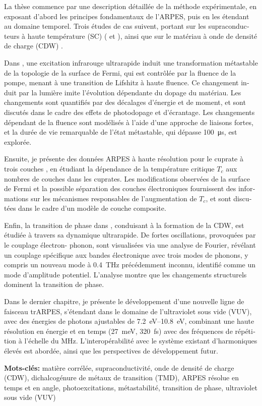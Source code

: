 \begin{otherlanguage}{french}
La thèse commence par une description détaillée de la méthode expérimentale, en exposant d’abord les principes fondamentaux de l’ARPES, puis en les étendant au domaine temporel.
Trois études de cas suivent, portant sur les supraconducteurs à haute température (SC) ( et ), ainsi que sur le matériau à onde de densité de charge (CDW) . 

Dans , une excitation infrarouge ultrarapide induit une transformation métastable de la topologie de la surface de Fermi, qui est contrôlée par la fluence de la pompe, menant à une transition de Lifshitz à haute fluence.
Ce changement induit par la lumière imite l’évolution dépendante du dopage du matériau.
Les changements sont quantifiés par des décalages d’énergie et de moment, et sont discutés dans le cadre des effets de photodopage et d’écrantage.
Les changements dépendant de la fluence sont modélisés à l’aide d’une approche de liaisons fortes, et la durée de vie remarquable de l’état métastable, qui dépasse \qty{100}{\micro\second}, est explorée.

Ensuite, je présente des données ARPES à haute résolution pour le cuprate à trois couches , en étudiant la dépendance de la température critique $T_c$ aux nombres de couches dans les cuprates.
Les modifications observées de la surface de Fermi et la possible séparation des couches électroniques fournissent des informations sur les mécanismes responsables de l’augmentation de $T_c$, et sont discutées dans le cadre d’un modèle de couche composite.

Enfin, la transition de phase dans , conduisant à la formation de la CDW, est étudiée à travers sa dynamique ultrarapide.
De fortes oscillations, provoquées par le couplage électron- phonon, sont visualisées via une analyse de Fourier, révélant un couplage spécifique aux bandes électronique avec trois modes de phonons, y compris un nouveau mode à \qty{0.4}{\tera\hertz} précédemment inconnu, identifié comme un mode d’amplitude potentiel.
L’analyse montre que les changements structurels dominent la transition de phase.

Dans le dernier chapitre, je présente le développement d’une nouvelle ligne de faisceau trARPES, s’étendant dans le domaine de l’ultraviolet sous vide (VUV), avec des énergies de photons ajustables de \qtyrange{7.2}{10.8}{\electronvolt}, combinant une haute résolution en énergie et en temps (\qty{27}{\milli\electronvolt}, \qty{320}{\femto\second}) avec des fréquences de répétition à l’échelle du \unit{\mega\hertz}.
L’interopérabilité avec le système existant d’harmoniques élevés est abordée, ainsi que les perspectives de développement futur.\hfill\break

\textbf{Mots-clés:} matière corrélée, supraconductivité, onde de densité de charge (CDW), dichalcogénure de métaux de transition (TMD), ARPES résolue en temps et en angle, photoexcitations, métastabilité, transition de phase, ultraviolet sous vide (VUV)




\end{otherlanguage}


